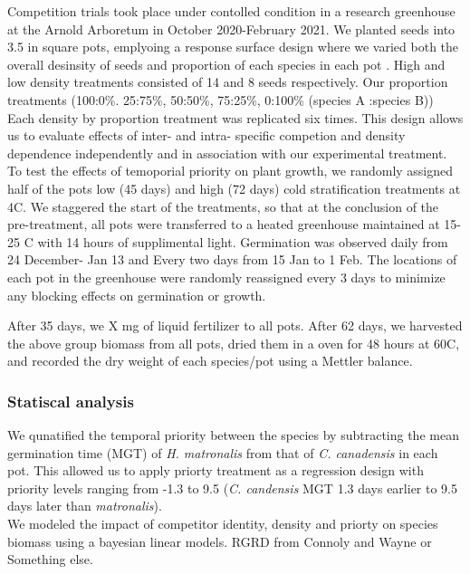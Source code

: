 \documentclass[11pt]{article}\usepackage[]{graphicx}\usepackage[]{color}
\begin{document}
\noindent Competition trials took place under contolled condition in a research greenhouse at the Arnold Arboretum  in October 2020-February 2021. We planted seeds into 3.5 in square pots, emplyoing a response surface design where we varied both the overall desinsity of seeds and proportion of each species in each pot \citep{Inouye2001}. High and low density treatments consisted of 14 and 8 seeds respectively. Our proportion treatments (100:0\%. 25:75\%, 50:50\%, 75:25\%, 0:100\% (species A :species B)) Each density by proportion treatment was replicated six times. This design allows us to evaluate effects of inter- and intra- specific competion and density dependence independently and in association with our experimental treatment.\\

\noindent To test the effects of temoporial priority on plant growth, we randomly assigned half of the pots low (45 days) and high (72 days) cold stratification treatments at 4\degree C. We staggered the start of the treatments, so that at the conclusion of the pre-treatment, all pots were transferred to a heated greenhouse maintained at 15-25 \degree C with 14 hours of supplimental light. Germination was observed daily from 24 December- Jan 13 and Every two days from 15 Jan to 1 Feb. The locations of each pot in the greenhouse were randomly reassigned every 3 days to minimize any blocking effects on germination or growth.

\noident After 35 days, we X mg of liquid fertilizer to all pots. After 62 days, we harvested the above group biomass from all pots, dried them in a oven for 48 hours at 60\degree C, and recorded the dry weight of each species/pot using a Mettler balance.\\

\subsubsection*{Statiscal analysis}
\noindent We qunatified the temporal priority between the species by subtracting the mean germination time (MGT) of \textit{H. matronalis} from that of \textit{C. canadensis} in each pot. This allowed us to apply priorty treatment as a regression design \citep{} with priority levels ranging from -1.3 to 9.5 (\textit{C. candensis} MGT 1.3 days earlier to 9.5 days later than \textit{matronalis}).\\

\noindent We modeled the impact of competitor identity, density and priorty on species biomass using a bayesian linear models. RGRD from Connoly and Wayne or Something else. 
\end{document}
